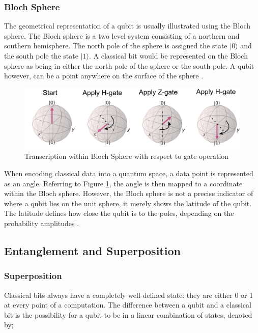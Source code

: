 \subsubsection*{Bloch Sphere}

The geometrical representation of a qubit is usually illustrated using the Bloch sphere. The Bloch sphere is a two level system consisting of a northern and southern hemisphere. 
The north pole of the sphere is assigned the state $\vert0\rangle $ and the south pole the state $\vert 1\rangle $. A classical bit would be represented on the Bloch sphere as being in either the north pole of the sphere or the south pole. A qubit however, can be a point anywhere on the surface of the sphere \citep{he2003}.

\begin{figure}
      \centering
      \includegraphics[scale=0.5]{background/blochS.PNG}
      \caption{Transcription within Bloch Sphere with respect to gate operation \cite{theJBC}}
      \label{fourBlokVec}
\end{figure}

When encoding classical data into a quantum space, a data point is represented as an angle. Referring to Figure \ref{fourBlokVec}, the angle is then mapped to a coordinate within the Bloch sphere. 
 However, the Bloch sphere is not a precise indicator of where a qubit lies on the unit sphere, it merely shows the latitude of the qubit. The latitude defines how close the qubit is to the poles, depending on the probability amplitudes \citep{he2003}.

\subsection{Entanglement and Superposition}

\subsubsection*{Superposition}

Classical bits always have a completely well-defined state: they are either 0 or 1 at every point of a computation. The difference between a qubit and a classical bit is the possibility for a qubit to be in a linear combination of states, denoted by;

